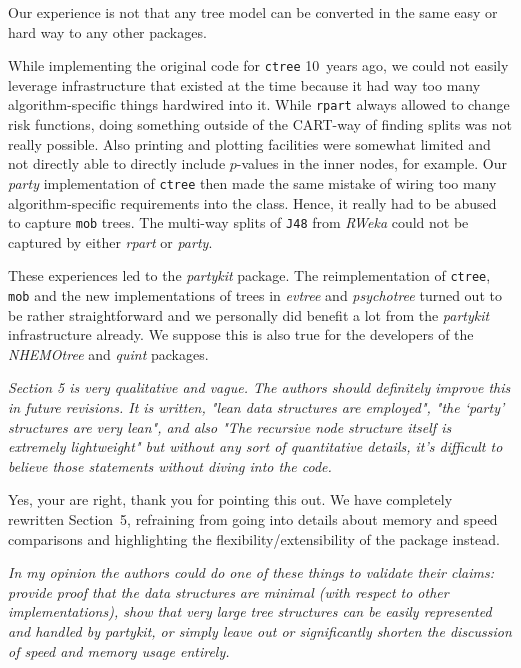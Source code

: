 \documentclass{article}
\begin{document}
\smallskip

Our experience is not that any tree model can be converted in the same easy
or hard way to any other packages.

While implementing the original code for \texttt{ctree} 10~years ago, we could
not easily leverage infrastructure that existed at the time because it had way too many
algorithm-specific things hardwired into it. While \texttt{rpart}
always allowed to change risk functions, doing something outside of the
CART-way of finding splits was not really possible. Also printing and plotting
facilities were somewhat limited and not directly able to directly include $p$-values
in the inner nodes, for example.
Our \emph{party} implementation of \texttt{ctree} then made the same mistake of
wiring too many algorithm-specific requirements into the class. Hence, it really
had to be abused to capture \texttt{mob} trees. The multi-way splits of
\texttt{J48} from \emph{RWeka} could not be captured by either \emph{rpart}
or \emph{party}.

These experiences led to the \emph{partykit} package. The reimplementation of
\texttt{ctree}, \texttt{mob} and the new implementations of trees in \emph{evtree} and \emph{psychotree}
turned out to be rather straightforward and we personally did benefit a lot
from the \emph{partykit} infrastructure already. We suppose this is also true for
the developers of the \emph{NHEMOtree} and \emph{quint} packages.

\medskip

\textit{%
Section 5 is very qualitative and vague.  The authors should definitely
improve this in future revisions.  It is written, "lean data structures are
employed", "the `party' structures are very lean", and also "The recursive
node structure itself is extremely lightweight" but without any sort of
quantitative details, it's difficult to believe those statements without
diving into the code.
}

\smallskip

Yes, your are right, thank you for pointing this out. We have completely
rewritten Section~5, refraining from going into details about memory and
speed comparisons and highlighting the flexibility/extensibility of the
package instead.

\medskip

\textit{%
In my opinion the authors could do one of these things to validate their
claims: provide proof that the data structures are minimal (with respect to
other implementations), show that very large tree structures can be easily
represented and handled by partykit, or simply leave out or significantly
shorten the discussion of speed and memory usage entirely.
}
\end{document}
